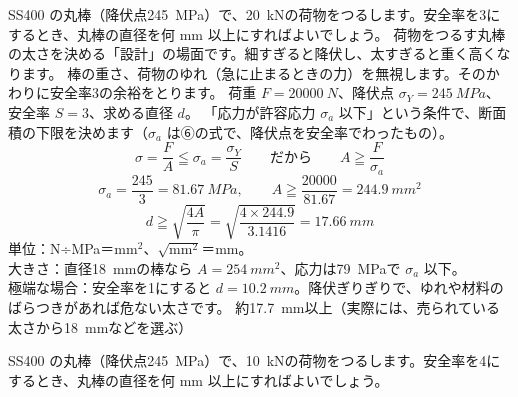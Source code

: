 \begin{phreidai}
\label{ph:力-8:ex3}SS400 の丸棒（降伏点\qty{245}{MPa}）で、\qty{20}{kN}の荷物をつるします。安全率を3にするとき、丸棒の直径を何 mm 以上にすればよいでしょう。
\phbamen
荷物をつるす丸棒の太さを決める「設計」の場面です。細すぎると降伏し、太すぎると重く高くなります。
\phmushi
棒の重さ、荷物のゆれ（急に止まるときの力）を無視します。そのかわりに安全率3の余裕をとります。
\phzu
荷重 $F=\qty{20000}{N}$、降伏点 $\sigma_Y=\qty{245}{MPa}$、安全率 $S=3$、求める直径 $d$。
\phriyu
「応力が許容応力 $\sigma_a$ 以下」という条件で、断面積の下限を決めます（$\sigma_a$ は⑥の式で、降伏点を安全率でわったもの）。
\phtateru
\[\sigma=\frac{F}{A}\leqq\sigma_a=\frac{\sigma_Y}{S}\qquad\text{だから}\qquad A\geqq\frac{F}{\sigma_a}\]
\phtoku
\[\sigma_a=\frac{245}{3}=\qty{81.67}{MPa},\qquad A\geqq\frac{\num{20000}}{81.67}=\qty{244.9}{mm^2}\]
\[d\geqq\sqrt{\frac{4A}{\pi}}=\sqrt{\frac{4\times244.9}{3.1416}}=\qty{17.66}{mm}\]
\phtashikame
単位：N÷MPa＝mm$^2$、$\sqrt{\mathrm{mm^2}}$＝mm。\\
大きさ：直径\qty{18}{mm}の棒なら $A=\qty{254}{mm^2}$、応力は\qty{79}{MPa}で $\sigma_a$ 以下。\\
極端な場合：安全率を1にすると $d=\qty{10.2}{mm}$。降伏ぎりぎりで、ゆれや材料のばらつきがあれば危ない太さです。
\kotae 約\qty{17.7}{mm}以上（実際には、売られている太さから\qty{18}{mm}などを選ぶ）
\end{phreidai}
\begin{jibun}
SS400 の丸棒（降伏点\qty{245}{MPa}）で、\qty{10}{kN}の荷物をつるします。安全率を4にするとき、丸棒の直径を何 mm 以上にすればよいでしょう。
\end{jibun}

